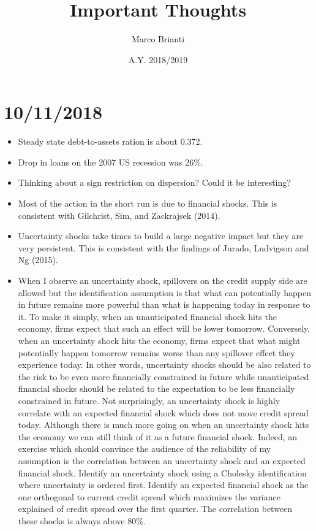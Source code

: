 \documentclass{article}
\title{Important Thoughts}
\author{Marco Brianti}
\date{A.Y. 2018/2019}
\begin{document}
	\large{

\maketitle

\section*{10/11/2018}

\begin{itemize}
	\item Steady state debt-to-assets ration is about 0.372.
	\item Drop in loans on the 2007 US recession was 26\%.
	\item Thinking about a sign restriction on dispersion? Could it be interesting?
	\item Most of the action in the short run is due to financial shocks. This is consistent with Gilchrist, Sim, and Zackrajsek (2014).
	\item Uncertainty shocks take times to build a large negative impact but they are very persistent. This is consistent with the findings of Jurado, Ludvigson and Ng (2015).
	\item When I observe an uncertainty shock, spillovers on the credit supply side are allowed but the identification assumption is that what can potentially happen in future remains more powerful than what is happening today in response to it. To make it simply, when an unanticipated financial shock hits the economy, firms expect that such an effect will be lower tomorrow. Conversely, when an uncertainty shock hits the economy, firms expect that what might potentially happen tomorrow remains worse than any spillover effect they experience today. In other words, uncertainty shocks should be also related to the risk to be even more financially constrained in future while unanticipated financial shocks should be related to the expectation to be less financially constrained in future. Not surprisingly, an uncertainty shock is highly correlate with an expected financial shock which does not move credit spread today. Although there is much more going on when an uncertainty shock hits the economy we can still think of it as a future financial shock. Indeed, an exercise which should convince the audience of the reliability of my assumption is the correlation between an uncertainty shock and an expected financial shock. Identify an uncertainty shock using a Cholesky identification where uncertainty is ordered first. Identify an expected financial shock as the one orthogonal to current credit spread which maximizes the variance explained of credit spread over the first quarter. The correlation between these shocks is always above 80\%.

\end{itemize}}
\end{document}
